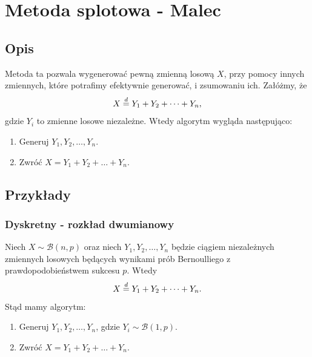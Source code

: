 \documentclass[12pt]{mwrep}
\begin{document}
%









	
	\section{Metoda splotowa - Malec}
	
	\subsection{Opis}
	\noindent Metoda ta pozwala wygenerować pewną zmienną losową $X$, przy pomocy innych zmiennych, które potrafimy efektywnie generować, i zsumowaniu ich. Załóżmy, że
	$$ X \buildrel{d} \over{=} Y_1 + Y_2 + \dots + Y_n, $$
	gdzie $Y_i$ to zmienne losowe niezależne. Wtedy algorytm wygląda następująco:
	\begin{enumerate}
		\item Generuj $ Y_1, Y_2, \dots, Y_n $.
		\item Zwróć $ X = Y_1 + Y_2 + \dots + Y_n $.
	\end{enumerate}

	\subsection{Przykłady}
	
	\subsubsection{Dyskretny - rozkład dwumianowy}
	\noindent Niech $ X \sim \mathcal{B}(n, p) $ oraz niech $Y_1, Y_2, \dots, Y_n$ będzie ciągiem niezależnych zmiennych losowych będących wynikami prób Bernoulliego z prawdopodobieństwem sukcesu $p$. Wtedy
	$$ X \buildrel{d} \over{=} Y_1 + Y_2 + \dots + Y_n. $$
	Stąd mamy algorytm:
	\begin{enumerate}[leftmargin=10mm]
		\item Generuj $ Y_1, Y_2, \dots, Y_n $, gdzie $Y_i \sim \mathcal{B}(1, p) $.
		\item Zwróć $ X = Y_1 + Y_2 + \dots + Y_n $.
	\end{enumerate}
	
\end{document}
